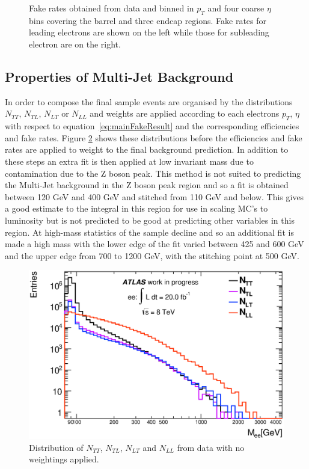 \begin{figure}[h]
\begin{center}
      \end{center}
   \caption{Fake rates obtained from data and binned in $p_{T}$ and four coarse $\eta$ bins covering the barrel and three endcap regions. Fake rates for leading electrons are shown on the left while those for subleading electron are on the right.}
   \label{fig:fakeRates}
   \end{figure}




\subsection{Properties of Multi-Jet Background}

In order to compose the final sample events are organised by the distributions $N_{TT}$, $N_{TL}$, $N_{LT}$ or $N_{LL}$ and weights are applied according to each electrons $p_{T}$, $\eta$ with respect to equation~\ref{eq:mainFakeResult} and the corresponding efficiencies and fake rates. 
Figure \ref{fig:N_dist} shows these distributions before the efficiencies and fake rates are applied to weight to the final background prediction. In addition to these steps an extra fit is then applied at low invariant mass due to contamination due to the Z boson peak. This method is not suited to predicting the Multi-Jet background in the Z boson peak region and so a fit is obtained between 120 GeV and 400 GeV and stitched from 110 GeV and below. This gives a good estimate to the integral in this region for use in scaling MC's to luminosity but is not predicted to be good at predicting other variables in this region. At high-mass statistics of the sample decline and so an additional fit is made a high mass with the lower edge of the fit varied between 425 and 600 GeV and the upper edge from 700 to 1200 GeV, with the stitching point at 500 GeV.

   \begin{figure}[h]
      \begin{center}
      \includegraphics[scale=0.8]{images/N_distributions.eps}
      \end{center}
   \caption{Distribution of $N_{TT}$, $N_{TL}$, $N_{LT}$ and $N_{LL}$ from data with no weightings applied.}
   \label{fig:N_dist}
   \end{figure}






